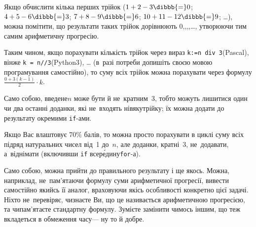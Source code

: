 \Tutorial

Якщо обчислити кілька перших трійок 
(${1 + 2 - 3}\dibbb{{=}}0$;\linebreak[2]\hspace{0.125em plus 0.5em}
${4 + 5 - 6}\dibbb{{=}}3$;\linebreak[2]\hspace{0.125em plus 0.5em}
${7 + 8 - 9}\dibbb{{=}}6$;\linebreak[2]\hspace{0.125em plus 0.5em}
${10 + 11 - 12}\dibbb{{=}}9$;\nolinebreak[3]\hspace{0.125em plus 0.5em} \dots),
можна помітити, що результати таких трійок дорівнюють 
0,,,,\nolinebreak[3]
\dots,
утворюючи тим самим арифметичну прогресію.

Таким чином, якщо порахувати кількість трійок через вираз 
\texttt{k:=n~div~3}\nolinebreak[2] (Pascal),
він\nolinebreak[3] же \texttt{k~=~n//3}\nolinebreak[2] (Python3),
\dots{} (в~разі потреби допишіть своєю мовою програмування самостійно),
то суму всіх трійок можна порахувати через формулу ${\frac{0+3(k-1)}{2}\cdot{}k}$.

Само собою, введене\nolinebreak[3] $n$ може бути й не~кратним~3, тобто можуть лишитися один чи два останні доданки, які не~входять ні\nolinebreak[3] в\nolinebreak[3] яку\nolinebreak[2] трійку; їх можна додати до результату окремими \texttt{if}-ами.


Якщо Вас влаштовує 70\% балів, то можна просто порахувати в циклі суму всіх підряд натуральних чисел від~1 до~$n$, але доданки, кратні~3, не~додавати, а~віднімати (включивши \texttt{if} всер\'{е}дину\nolinebreak[2] \mbox{\texttt{for}-а}). 

Само собою, можна прийти до правильного результату і ще якось. Можна, наприклад, не~пам'ятаючи формулу суми арифметичної прогресії, вивести самостійно якийсь її аналог, враховуючи якісь особливості конкретно цієї задачі. Ніхто не~перевіряє, чи\nolinebreak[3] знаєте Ви, що це називається арифметичною прогресією, та чи\nolinebreak[3] пам'ятаєте стандартну формулу. Зумієте замінити чимось іншим, що теж вкладеться в обмеження часу\nolinebreak[3] --- ну то й добре.


